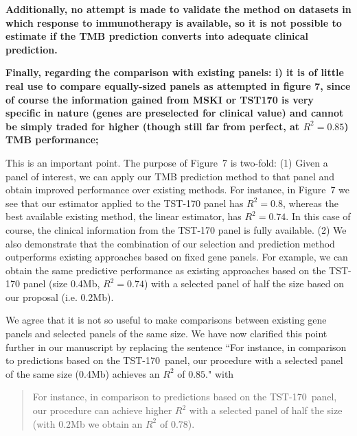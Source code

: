 \documentclass[12pt]{article}
\begin{document}


\textbf{Additionally, no attempt is made to validate the method on datasets in which response to immunotherapy is available, so it is not possible to estimate if the TMB prediction converts into adequate clinical prediction.}


\textbf{Finally, regarding the comparison with existing panels: 
i) it is of little real use to compare equally-sized panels as attempted in figure 7, since of course the information gained from MSKI or TST170 is very specific in nature (genes are preselected for clinical value) and cannot be simply traded for higher (though still far from perfect, at $R^2=0.85$) TMB performance;}

This is an important point. The purpose of Figure~7 is two-fold: (1) Given a panel of interest, we can apply our TMB prediction method to that panel and obtain improved performance over existing methods. For instance, in Figure~7 we see that our estimator applied to the TST-170 panel has $R^2 = 0.8$, whereas the best available existing method, the linear estimator, has $R^2 = 0.74$. In this case of course, the clinical information from the TST-170 panel is fully available. (2) We also demonstrate that the combination of our selection and prediction method outperforms existing approaches based on fixed gene panels. For example, we can obtain the same predictive performance as existing approaches based on the TST-170 panel (size 0.4Mb, $R^2 = 0.74$) with a selected panel of half the size based on our proposal (i.e. 0.2Mb). 

We agree that it is not so useful to make comparisons between existing gene panels and selected panels of the same size.  We have now clarified this point further in our manuscript by replacing the sentence ``For instance, in comparison to predictions based on the TST-170~panel, our procedure with a selected panel of the same size (0.4Mb) achieves an $R^2$ of $0.85$." with 
\begin{quotation} 
For instance, in comparison to predictions based on the TST-170~panel, our procedure can achieve higher $R^2$ with a selected panel of half the size (with $0.2$Mb we obtain an $R^2$ of $0.78$).
\end{quotation} 
\end{document}
